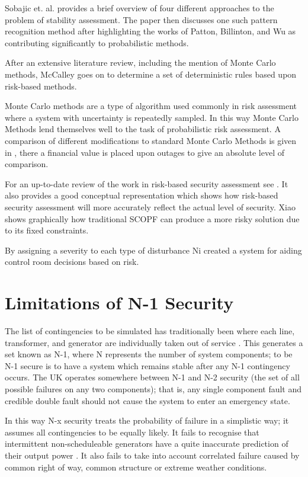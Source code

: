 \documentclass[a4paper,oneside,12pt]{report}
\begin{document}
Sobajic et. al. \cite{Sobajic1989} provides a brief overview of four different approaches to the problem of stability assessment. The paper then discusses one such pattern recognition method after highlighting the works of Patton, Billinton, and Wu as contributing significantly to probabilistic methods.

After an extensive literature review, including the mention of Monte Carlo methods, McCalley \cite{McCalley1997} goes on to determine a set of deterministic rules based upon risk-based methods.

Monte Carlo methods are a type of algorithm used commonly in risk assessment where a system with uncertainty is repeatedly sampled. In this way Monte Carlo Methods lend themselves well to the task of probabilistic risk assessment. A comparison of different modifications to standard Monte Carlo Methods is given in \cite{Bell1999}, there a financial value is placed upon outages to give an absolute level of comparison.

For an up-to-date review of the work in risk-based security assessment see \cite{Kirschen2007}. It also provides a good conceptual representation which shows how risk-based security assessment will more accurately reflect the actual level of security. Xiao \cite{Xiao2007} shows graphically how traditional SCOPF can produce a more risky solution due to its fixed constraints.

By assigning a severity to each type of disturbance Ni \cite{Ni2003} created a system for aiding control room decisions based on risk.

\section{Limitations of N-1 Security}

The list of contingencies to be simulated has traditionally been where each line, transformer, and generator are individually taken out of service \cite{Kirschen2007}. This generates a set known as N-1, where N represents the number of system components; to be N-1 secure is to have a system which remains stable after any N-1 contingency occurs. The UK operates somewhere between N-1 and N-2 security (the set of all possible failures on any two components); that is, any single component fault and credible double fault should not cause the system to enter an emergency state.

In this way N-x security treats the probability of failure in a simplistic way; it assumes all contingencies to be equally likely. It fails to recognise that intermittent non-scheduleable generators have a quite inaccurate prediction of their output power \cite{Bathurst2002}. It also fails to take into account correlated failure caused by common right of way, common structure or extreme weather conditions.
\end{document}
